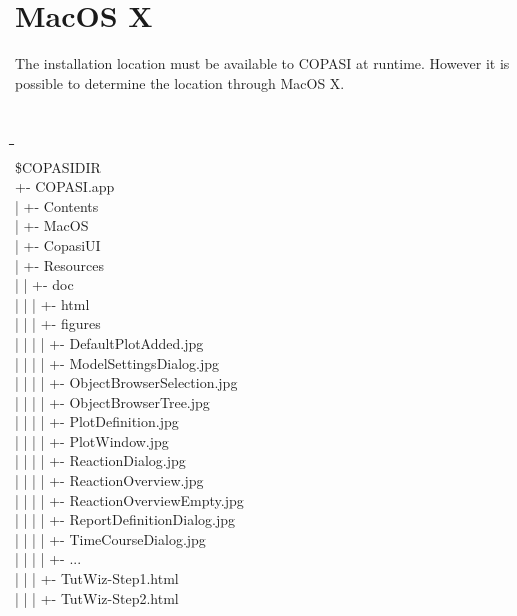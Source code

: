 \documentclass[12pt]{book}
\begin{document}
\section{MacOS X}
The installation location must be available to COPASI at
runtime. However it is possible to determine the location through MacOS
X.
{\tt \scriptsize
\begin{tabbing}
 \hspace{4 pt}\=\hspace{17 pt}\=\hspace{17 pt}\=\hspace{17
 pt}\=\hspace{17 pt}\=\hspace{17 pt}\= \\ [-12 pt]
 \$COPASIDIR \\
 \> +- COPASI.app \\
 \> | \> +- Contents \\
 \> | \> +- MacOS \\
 \> | \> +- CopasiUI \\
 \> | \> +- Resources \\
 \> | \> | \> +- doc \\
 \> | \> | \> | \> +- html \\
 \> | \> | \> | \> \> +- figures \\
 \> | \> | \> | \> \> | \> +- DefaultPlotAdded.jpg \\
 \> | \> | \> | \> \> | \> +- ModelSettingsDialog.jpg \\
 \> | \> | \> | \> \> | \> +- ObjectBrowserSelection.jpg \\
 \> | \> | \> | \> \> | \> +- ObjectBrowserTree.jpg \\
 \> | \> | \> | \> \> | \> +- PlotDefinition.jpg \\
 \> | \> | \> | \> \> | \> +- PlotWindow.jpg \\
 \> | \> | \> | \> \> | \> +- ReactionDialog.jpg \\
 \> | \> | \> | \> \> | \> +- ReactionOverview.jpg \\
 \> | \> | \> | \> \> | \> +- ReactionOverviewEmpty.jpg \\
 \> | \> | \> | \> \> | \> +- ReportDefinitionDialog.jpg \\
 \> | \> | \> | \> \> | \> +- TimeCourseDialog.jpg \\
 \> | \> | \> | \> \> | \> +- ... \\
 \> | \> | \> | \> \> +- TutWiz-Step1.html \\
 \> | \> | \> | \> \> +- TutWiz-Step2.html \\

\end{tabbing}}
\end{document}
